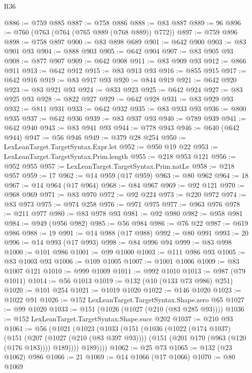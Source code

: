 \begin{lexlean}{R36}
\begin{coremodule}
@886 := @759 @885
@887 := @758 @886
@888 := @83 @887
@889 := 96
@896 := @760 (@763 (@764 (@765 @889 (@768 @889)) @772))
@897 := @759 @896
@898 := @758 @897
@900 := @83 @898 @689
@901 := @642 @900
@903 := @83 @901 @93
@904 := @888 @903
@905 := @642 @904
@907 := @83 @905 @93
@908 := @877 @907
@909 := @642 @908
@911 := @83 @909 @93
@912 := @866 @911
@913 := @642 @912
@915 := @83 @913 @93
@916 := @855 @915
@917 := @642 @916
@919 := @83 @917 @93
@920 := @844 @919
@921 := @642 @920
@923 := @83 @921 @93
@924 := @833 @923
@925 := @642 @924
@927 := @83 @925 @93
@928 := @822 @927
@929 := @642 @928
@931 := @83 @929 @93
@932 := @811 @931
@933 := @642 @932
@935 := @83 @933 @93
@936 := @800 @935
@937 := @642 @936
@939 := @83 @937 @93
@940 := @789 @939
@941 := @642 @940
@943 := @83 @941 @93
@944 := @778 @943
@946 := @640 (@642 @944)
@947 := @56 @946
@949 := @379 @28 @254
@950 := LexLeanTarget.TargetSyntax.Expr.let
@952 := @950 @19 @22
@953 := LexLeanTarget.TargetSyntax.Prim.length
@955 := @218 @953 @121
@956 := @952 @955
@957 := LexLeanTarget.TargetSyntax.Prim.natLe
@958 := @218 @957
@959 := 17
@962 := @14 @959 (@17 @959)
@963 := @80 @962
@964 := 18
@967 := @14 @964 (@17 @964)
@968 := @84 @967
@969 := @92 @121
@970 := @968 @969
@971 := @83 @970
@972 := @92 @224
@973 := @220 @972
@974 := @83 @973
@975 := @974 @258
@976 := @971 @975
@977 := @963 @976
@978 := @211 @977
@980 := @83 @978 @93
@981 := @92 @980
@982 := @958 @981
@984 := @949 (@956 @982)
@985 := @56 @984
@986 := @76 @22
@987 := @619 @986
@988 := 19
@991 := @14 @988 (@17 @988)
@992 := @80 @991
@993 := 20
@996 := @14 @993 (@17 @993)
@998 := @84 @996 @94
@999 := @83 @998
@1000 := @101 @986
@1001 := @99 @1000
@1003 := @111 @986 @93
@1005 := @83 @1003 @93
@1006 := @109 @1005
@1007 := @1001 @1006
@1009 := @83 @1007 @121
@1010 := @999 @1009
@1011 := @992 @1010
@1013 := @987 (@79 @1011)
@1014 := @56 @1013
@1019 := @132 (@10 (@133 @73 @986) @251)
@1020 := @101 @254
@1021 := @1019 @1020
@1022 := @146 @1020
@1023 := @1022 @91
@1026 := @152 LexLeanTarget.TargetSyntax.Shape.zero @65
@1027 := @99 @1020
@1033 := @151 (@1026 (@1027 (@210 (@83 @285 @93))))
@1036 := @152 LexLeanTarget.TargetSyntax.Shape.succ @202
@1037 := @210 @93
@1061 := @56
    (@1021
      (@1023
        (@1033
          (@151
            (@1036
              (@1022
                (@174 @1037)
                (@151
                  (@207 (@1027 (@210 (@83 @397 @93))))
                  (@151 (@201 @170 (@963 (@120 (@176 @183)))) @189))))
            @189))))
@1062 := @25 @73
@1065 := @132 (@23 @1062) @986
@1066 := 21
@1069 := @14 @1066 (@17 @1066)
@1070 := @80 @1069

\end{coremodule}
\end{lexlean}
